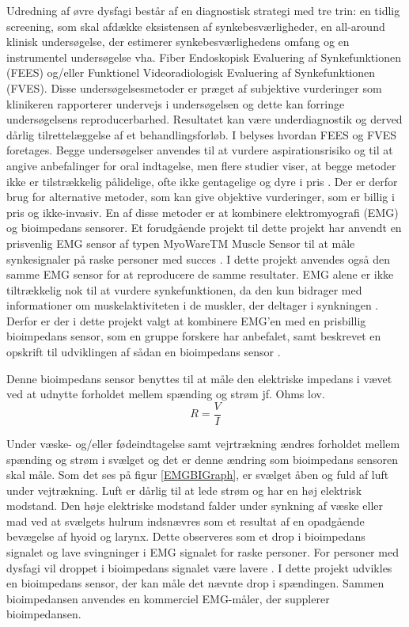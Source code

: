 Udredning af øvre dysfagi består af en diagnostisk strategi med tre trin: en tidlig screening, som skal afdække eksistensen af synkebesværligheder, en all-around klinisk undersøgelse, der estimerer synkebesværlighedens omfang og en instrumentel undersøgelse vha. Fiber Endoskopisk Evaluering af Synkefunktionen (FEES) og/eller Funktionel Videoradiologisk Evaluering af Synkefunktionen (FVES). Disse undersøgelsesmetoder er præget af subjektive vurderinger som klinikeren rapporterer undervejs i undersøgelsen og dette kan forringe undersøgelsens reproducerbarhed.
 Resultatet kan være underdiagnostik og derved dårlig tilrettelæggelse af et behandlingsforløb. I  belyses hvordan FEES og FVES foretages. Begge undersøgelser anvendes til at vurdere aspirationsrisiko og til at angive anbefalinger for oral indtagelse, men flere studier viser, at begge metoder ikke er tilstrækkelig pålidelige, ofte ikke gentagelige og dyre i pris \cite{Kelly2006} \cite{McCullough2001} \cite{Schultheiss2014} \cite{Nahrstaedt2012a}.  Der er derfor brug for alternative metoder, som kan give objektive vurderinger, som er billig i pris og ikke-invasiv. En af disse metoder er at kombinere elektromyografi (EMG) og bioimpedans sensorer. Et forudgående projekt til dette projekt har anvendt en prisvenlig EMG sensor af typen MyoWareTM Muscle Sensor til at måle synkesignaler på raske personer med succes \cite [s. 58] {ChristensenElisabeth;LundbakStrand2017}. I dette projekt anvendes også den samme EMG sensor for at reproducere de samme resultater. EMG alene er ikke tiltrækkelig nok til at vurdere synkefunktionen, da den kun bidrager med informationer om muskelaktiviteten i de muskler, der deltager i synkningen \cite{Schultheiss2014}. Derfor er der i dette projekt valgt at kombinere EMG'en med en prisbillig bioimpedans sensor, som en gruppe forskere har anbefalet, samt beskrevet en opskrift til udviklingen af sådan en bioimpedans sensor \cite{Aroom2009}.

Denne bioimpedans sensor benyttes til at måle den elektriske impedans i vævet ved at udnytte forholdet mellem spænding og strøm jf. Ohms lov. \\
$$ R= \dfrac{V}{I} $$

Under væske- og/eller fødeindtagelse samt vejrtrækning ændres forholdet mellem spænding og strøm i svælget og det er denne ændring som bioimpedans sensoren skal måle. Som det ses på figur \ref{EMGBIGraph}, er svælget åben og fuld af luft under vejtrækning. Luft er dårlig til at lede strøm og har en høj elektrisk modstand. Den høje elektriske modstand falder under synkning af væske eller mad ved at svælgets hulrum indsnævres som et resultat af en opadgående bevægelse af hyoid og larynx. Dette observeres som et drop i bioimpedans signalet og lave svingninger i EMG signalet for raske personer. For personer med dysfagi vil droppet i bioimpedans signalet være lavere  \cite{Schultheiss2014}. I dette projekt udvikles en bioimpedans sensor, der kan måle det nævnte drop i spændingen. Sammen bioimpedansen anvendes en kommerciel EMG-måler, der supplerer bioimpedansen. 



